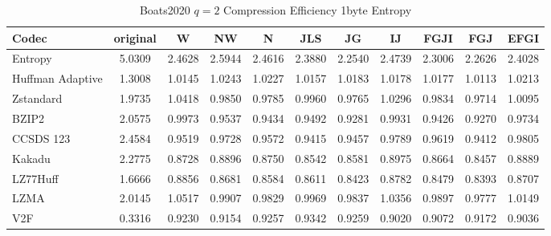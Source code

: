 \documentclass{article}
\begin{document}
\begin{table}[h!]
\centering
\caption{Boats2020 $q=2$ Compression Efficiency 1byte Entropy}
\begin{tabular}{|l|cccccccccc|}
\hline
Codec &  original &      W &     NW &      N &    JLS &     JG &     IJ &   FGJI &    FGJ &   EFGI \\
\hline
Entropy & 5.0309 & 2.4628 & 2.5944 & 2.4616 & 2.3880 & 2.2540 & 2.4739 & 2.3006 & 2.2626 & 2.4028 \\
\hline
Huffman Adaptive &    1.3008 & 1.0145 & 1.0243 & 1.0227 & 1.0157 & 1.0183 & 1.0178 & 1.0177 & 1.0113 & 1.0213 \\
Zstandard        &    1.9735 & 1.0418 & 0.9850 & 0.9785 & 0.9960 & 0.9765 & 1.0296 & 0.9834 & 0.9714 & 1.0095 \\
BZIP2            &    2.0575 & 0.9973 & 0.9537 & 0.9434 & 0.9492 & 0.9281 & 0.9931 & 0.9426 & 0.9270 & 0.9734 \\
CCSDS 123        &    2.4584 & 0.9519 & 0.9728 & 0.9572 & 0.9415 & 0.9457 & 0.9789 & 0.9619 & 0.9412 & 0.9805 \\
Kakadu           &    2.2775 & 0.8728 & 0.8896 & 0.8750 & 0.8542 & 0.8581 & 0.8975 & 0.8664 & 0.8457 & 0.8889 \\
LZ77Huff         &    1.6666 & 0.8856 & 0.8681 & 0.8584 & 0.8611 & 0.8423 & 0.8782 & 0.8479 & 0.8393 & 0.8707 \\
LZMA             &    2.0145 & 1.0517 & 0.9907 & 0.9829 & 0.9969 & 0.9837 & 1.0356 & 0.9897 & 0.9777 & 1.0149 \\
V2F              &    0.3316 & 0.9230 & 0.9154 & 0.9257 & 0.9342 & 0.9259 & 0.9020 & 0.9072 & 0.9172 & 0.9036 \\
\hline
\end{tabular}
\end{table}
\end{document}
